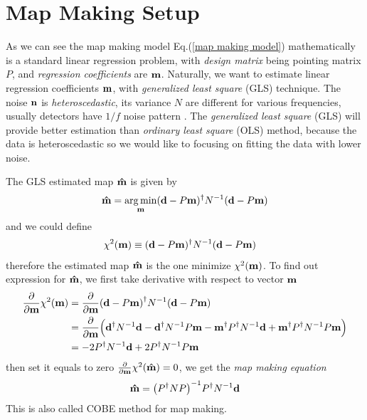 \documentclass[11pt, letterpaper]{article}
\DeclareMathOperator*{\argmin}{arg\,min}
\newcommand{\vbd}{\vb{d}}
\newcommand{\vbm}{\vb{m}}
\newcommand{\vbn}{\vb{n}}
\newcommand{\inv}[1]{#1^{-1}}
\newcommand{\hatm}{\vb{\hat{m}}}
\newcommand{\Pdagger}{P^{\dagger}}
\newcommand{\PPinv}[1]{\inv{\qty(\Pdagger #1 P)}}
\begin{document}
\section{Map Making Setup}
As we can see the map making model Eq.(\ref{map making model}) mathematically 
is a standard linear regression problem,
with \textit{design matrix} being pointing matrix $P$, and \textit{regression
coefficients} are $\vbm$.
Naturally, we want to estimate linear regression coefficients $\vbm$,
with \textit{generalized least square} (GLS) technique.
The noise $\vbn$ is \textit{heteroscedastic}, its variance $N$ are 
different for various frequencies, usually detectors have $1/f$ noise pattern
\cite{1997PhRvD..56.4514T}.
The \textit{generalized least square} (GLS) will provide better estimation 
than \textit{ordinary least square} (OLS) method, because the data is
heteroscedastic so we would like to focusing on fitting the data with lower 
noise.

The GLS estimated map $\hatm$ is given by
\begin{equation}
\hatm = \argmin_{\vbm} (\vbd - P\vbm)^{\dagger} N^{-1} (\vbd - P \vbm) 
\label{GLS estimator equation}
\end{equation}
and we could define 
\begin{align}
\chi^2(\vbm) & \equiv (\vbd - P\vbm)^{\dagger} N^{-1} (\vbd - P \vbm) 
\label{chi2 formula}
\end{align}
therefore the estimated map $\hatm$ is the one minimize $\chi^2(\vbm)$.
To find out expression for $\hatm$, we first take derivative with respect to 
vector $\vbm$
\begin{align}
\begin{aligned}[b]
\pdv{\vbm} \chi^2(\vbm)
&= \pdv{\vbm} (\vbd - P\vbm)^{\dagger} N^{-1} (\vbd - P \vbm)
\\
&= \pdv{\vbm} \qty\Big(
    \vbd^{\dagger} N^{-1} \vbd 
    - \vbd^{\dagger} N^{-1} P \vbm 
    - \vbm^{\dagger}\Pdagger N^{-1}\vbd 
    + \vbm^{\dagger} \Pdagger N^{-1}P\vbm
)
\\
&= -2\Pdagger N^{-1} \vbd + 2 \Pdagger N^{-1} P \vbm
\label{dchi2/dm}
\end{aligned}
\end{align}
then set it equals to zero $\pdv{\vbm} \chi^2(\hatm) = 0$,
we get the \textit{map making equation}
\begin{align}
\hatm = \PPinv{N} \Pdagger \inv{N} \vbd \label{map making equation}
\end{align}
This is also called COBE method for map making.
\end{document}
